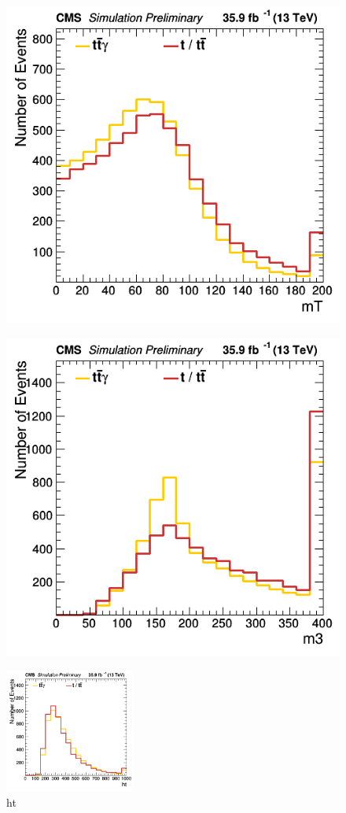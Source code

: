 \documentclass[11pt]{scrartcl}
\begin{document}
	\begin{figure}[H]
	\centering
	\begin{minipage}{.5\textwidth}
	  \centering
	  \includegraphics[width=0.75\linewidth]{figures/Select1/mT.png}
	  \label{fig:mT}
	\end{minipage}%
	\begin{minipage}{.5\textwidth}
	  \centering
	  \includegraphics[width=0.75\linewidth]{figures/Select1/m3.png}
	  \label{fig:m3}
	\end{minipage}
	\end{figure}

	\begin{figure}[H]
	\centering
	\includegraphics[width=0.38\textwidth]{figures/Select1/ht.png}
	\caption{ht}
 	\label{fig:ht}
	\end{figure}
	
\end{document}
